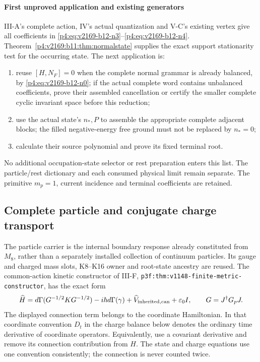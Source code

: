 \documentclass[12pt,a4paper]{article}
\begin{document}
\paragraph{First unproved application and existing generators}
III-A's complete action, IV's actual quantization and V-C's existing vertex
give all coefficients in \eqref{p4:eq:v2169-b12-n3}--\eqref{p4:eq:v2169-b12-n4}. Theorem~\ref{p4:v2169:b11:thm:normalstate} supplies the exact support
stationarity test for the occurring state. The next application is:
\begin{enumerate}
\item reuse $[H,N_F]=0$ when the complete normal grammar is already
balanced, by \eqref{p4:eq:v2169-b12-n0}; if the actual complete word contains
unbalanced coefficients, prove their assembled cancellation or certify the
smaller complete cyclic invariant space before this reduction;
\item use the actual state's $n_*,P$ to assemble the appropriate complete
adjacent blocks; the filled negative-energy free ground must not be replaced
by $n_*=0$;
\item calculate their source polynomial and prove its fixed terminal root.
\end{enumerate}
No additional occupation-state selector or rest preparation enters this list.
The particle/rest dictionary and each consumed physical limit remain separate.
The primitive $m_p=1$, current incidence and terminal coefficients are retained.







\subsection{Complete particle and conjugate charge transport}
\label{p4:v2171:sec:fullchain}
The particle carrier is the internal boundary response already constituted
from $M_8$, rather than a separately installed collection of continuum
particles. Its gauge and charged mass slots, K8--K16 owner and root-state
ancestry are reused. The common-action kinetic constructor of III-F,
\texttt{p3f:thm:v1148-finite-metric-constructor}, has the exact form
\begin{equation}
 \widehat H=d\Gamma(G^{-1/2}KG^{-1/2})
 -i\hbar d\Gamma(\gamma)+\widehat V_{\rm inherited,can}
 +\varepsilon_0I,
 \qquad G=J^\dagger G_pJ.
 \label{p4:v2171:eq:fullham}
\end{equation}
The displayed connection term belongs to the coordinate Hamiltonian.
In that coordinate convention $D_t$ in the charge balance below denotes the
ordinary time derivative of coordinate operators. Equivalently, use a
covariant derivative and remove its connection contribution from $H$.
The state and charge equations use one convention consistently; the
connection is never counted twice.
\end{document}
